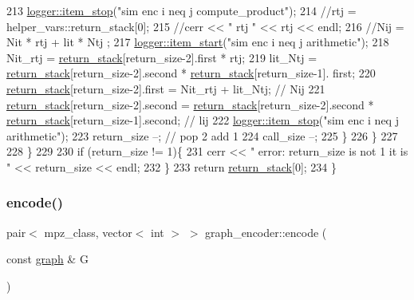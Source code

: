 \begin{DoxyCode}
213         \hyperlink{classlogger_a6775fee9681c437fc9c05d71cfbbe4a2}{logger::item\_stop}(\textcolor{stringliteral}{"sim enc i neq j compute\_product"});
214         \textcolor{comment}{//rtj = helper\_vars::return\_stack[0];}
215         \textcolor{comment}{//cerr << " rtj " << rtj << endl;}
216         \textcolor{comment}{//Nij = Nit * rtj + lit * Ntj ;}
217         \hyperlink{classlogger_a7e21ec6ad2d40cfc2c6a383521b5641a}{logger::item\_start}(\textcolor{stringliteral}{"sim enc i neq j arithmetic"});
218         Nit\_rtj = \hyperlink{namespacehelper__vars_a6d2100c373830cacd232319a9958652d}{return\_stack}[return\_size-2].first * rtj;
219         lit\_Ntj = \hyperlink{namespacehelper__vars_a6d2100c373830cacd232319a9958652d}{return\_stack}[return\_size-2].second * \hyperlink{namespacehelper__vars_a6d2100c373830cacd232319a9958652d}{return\_stack}[return\_size-1].
      first;
220         \hyperlink{namespacehelper__vars_a6d2100c373830cacd232319a9958652d}{return\_stack}[return\_size-2].first = Nit\_rtj + lit\_Ntj; \textcolor{comment}{// Nij}
221         \hyperlink{namespacehelper__vars_a6d2100c373830cacd232319a9958652d}{return\_stack}[return\_size-2].second = \hyperlink{namespacehelper__vars_a6d2100c373830cacd232319a9958652d}{return\_stack}[return\_size-2].second * 
      \hyperlink{namespacehelper__vars_a6d2100c373830cacd232319a9958652d}{return\_stack}[return\_size-1].second; \textcolor{comment}{// lij}
222         \hyperlink{classlogger_a6775fee9681c437fc9c05d71cfbbe4a2}{logger::item\_stop}(\textcolor{stringliteral}{"sim enc i neq j arithmetic"});
223         return\_size --; \textcolor{comment}{// pop 2 add 1}
224         call\_size --;
225       \}
226     \}
227 
228   \}
229 
230   \textcolor{keywordflow}{if} (return\_size != 1)\{
231     cerr << \textcolor{stringliteral}{" error: return\_size is not 1 it is "} << return\_size << endl;
232   \}
233   \textcolor{keywordflow}{return} \hyperlink{namespacehelper__vars_a6d2100c373830cacd232319a9958652d}{return\_stack}[0];
234 \}
\end{DoxyCode}
\mbox{\label{classgraph__encoder_a23350e4c0986763b24d14c5ef1beb37e}} 
\subsubsection{\texorpdfstring{encode()}{encode()}}
{\footnotesize\ttfamily pair$<$ mpz\+\_\+class, vector$<$ int $>$ $>$ graph\+\_\+encoder\+::encode (\begin{DoxyParamCaption}\item[{const \hyperlink{classgraph}{graph} \&}]{G }\end{DoxyParamCaption})}



